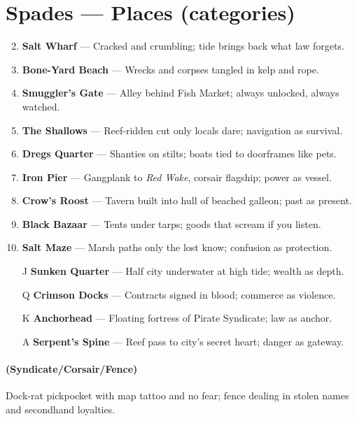 \section*{Spades --- Places (categories)}
\label{sec:zakov-places}
\begin{enumerate}
\setcounter{enumi}{1}
\item \textbf{Salt Wharf} --- Cracked and crumbling; tide brings back what law forgets.
\item \textbf{Bone-Yard Beach} --- Wrecks and corpses tangled in kelp and rope.
\item \textbf{Smuggler's Gate} --- Alley behind Fish Market; always unlocked, always watched.
\item \textbf{The Shallows} --- Reef-ridden cut only locals dare; navigation as survival.
\item \textbf{Dregs Quarter} --- Shanties on stilts; boats tied to doorframes like pets.
\item \textbf{Iron Pier} --- Gangplank to \textit{Red Wake}, corsair flagship; power as vessel.
\item \textbf{Crow's Roost} --- Tavern built into hull of beached galleon; past as present.
\item \textbf{Black Bazaar} --- Tents under tarps; goods that scream if you listen.
\item \textbf{Salt Maze} --- Marsh paths only the lost know; confusion as protection.
\item[J] \textbf{Sunken Quarter} --- Half city underwater at high tide; wealth as depth.
\item[Q] \textbf{Crimson Docks} --- Contracts signed in blood; commerce as violence.
\item[K] \textbf{Anchorhead} --- Floating fortress of Pirate Syndicate; law as anchor.
\item[A] \textbf{Serpent's Spine} --- Reef pass to city's secret heart; danger as gateway.
\end{enumerate}

\paragraph*{(Syndicate/Corsair/Fence)} Dock-rat pickpocket with map tattoo and no fear; fence dealing in stolen names and secondhand loyalties.

